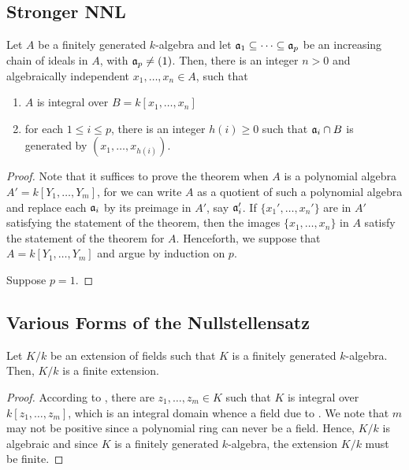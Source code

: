 \subsection{Stronger NNL}

\begin{theorem}
    Let $A$ be a finitely generated $k$-algebra and let $\mathfrak a_1\subseteq\dots\subseteq\mathfrak a_p$ be an increasing chain of ideals in $A$, with $\mathfrak a_p\ne (1)$. Then, there is an integer $n > 0$ and algebraically independent $x_1,\dots,x_n\in A$, such that 
    \begin{enumerate}[label=(\alph*)]
        \item $A$ is integral over $B = k[x_1,\dots,x_n]$
        \item for each $1\le i\le p$, there is an integer $h(i)\ge 0$ such that $\mathfrak a_i\cap B$ is generated by $(x_1,\dots,x_{h(i)})$.
    \end{enumerate}
\end{theorem}
\begin{proof}
    Note that it suffices to prove the theorem when $A$ is a polynomial algebra $A' = k[Y_1,\dots,Y_m]$, for we can write $A$ as a quotient of such a polynomial algebra and replace each $\mathfrak a_i$ by its preimage in $A'$, say $\mathfrak a_i'$. If $\{x_1',\dots,x_n'\}$ are in $A'$ satisfying the statement of the theorem, then the images $\{x_1,\dots,x_n\}$ in $A$ satisfy the statement of the theorem for $A$. Henceforth, we suppose that $A = k[Y_1,\dots,Y_m]$ and argue by induction on $p$.

    Suppose $p = 1$. 
\end{proof}

\subsection{Various Forms of the Nullstellensatz}

\begin{lemma}
    Let $K/k$ be an extension of fields such that $K$ is a finitely generated $k$-algebra. Then, $K/k$ is a finite extension.
\end{lemma}
\begin{proof}
    According to , there are $z_1,\dots,z_m\in K$ such that $K$ is integral over $k[z_1,\dots,z_m]$, which is an integral domain whence a field due to . We note that $m$ may not be positive since a polynomial ring can never be a field. Hence, $K/k$ is algebraic and since $K$ is a finitely generated $k$-algebra, the extension $K/k$ must be finite.
\end{proof}

